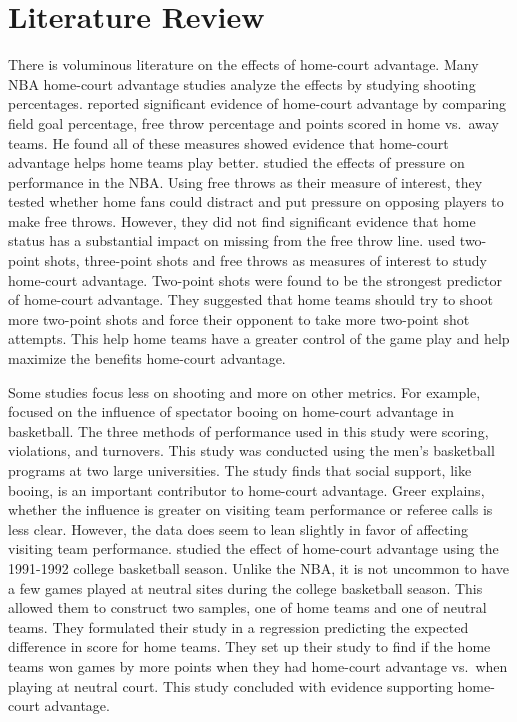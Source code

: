 \documentclass[10pt]{article}
\begin{document}
\section{Literature Review}
There is voluminous literature on the effects of home-court advantage.
Many NBA home-court advantage studies analyze the effects by studying shooting
percentages. \citet{Kotecki} reported significant evidence of home-court
advantage by comparing field goal
percentage, free throw percentage and points scored in home vs.~away teams.
He found all of these measures showed evidence that
home-court advantage helps home teams play better. \citet{Cao} studied the effects
of pressure on performance in the NBA. Using free throws as their measure of interest, 
they tested whether home
fans could distract and put pressure on opposing players to make free
throws. However, they did not find significant evidence
that home status has a substantial impact on missing from the free throw line. 
\citet{Harris} used two-point shots, three-point shots and free
throws as measures of interest to study home-court advantage. Two-point
shots were found to be the strongest predictor of home-court advantage. They
suggested that home teams should try to shoot more two-point shots and force
their opponent to take more two-point shot attempts. This help home teams have a
greater control of the game play and help maximize the benefits 
home-court advantage.

Some studies focus less on shooting and more on other metrics.
For example, \citet{Greer} focused on the influence of spectator booing on
home-court advantage in basketball. The three methods of performance used
in this study were scoring, violations, and turnovers. This study was conducted
using the men's basketball programs at two large universities. The study finds that
social support, like booing, is an important contributor to home-court advantage.
Greer explains, whether the influence is greater on visiting team performance or
referee calls is less clear. However, the data does seem to lean slightly in
favor of affecting visiting team performance. \citet{Harville} studied the
effect of home-court advantage using the 1991-1992 college basketball season.
Unlike the NBA, it is not uncommon to have a few games played at neutral sites
during the college basketball season. This allowed them to construct two samples,
one of home teams and one of neutral teams. They formulated their study in a
regression predicting the expected difference in score for home teams.
They set up their study to find if the home teams won games by more points when
they had home-court advantage vs.~when playing at neutral court. This study
concluded with evidence supporting home-court advantage.
\end{document}
